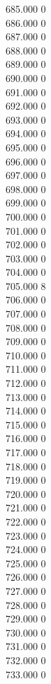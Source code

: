 { 685.000	0 \\
 686.000	0 \\
 687.000	0 \\
 688.000	0 \\
 689.000	0 \\
 690.000	0 \\
 691.000	0 \\
 692.000	0 \\
 693.000	0 \\
 694.000	0 \\
 695.000	0 \\
 696.000	0 \\
 697.000	0 \\
 698.000	0 \\
 699.000	0 \\
 700.000	0 \\
 701.000	0 \\
 702.000	0 \\
 703.000	0 \\
 704.000	0 \\
 705.000	8 \\
 706.000	0 \\
 707.000	0 \\
 708.000	0 \\
 709.000	0 \\
 710.000	0 \\
 711.000	0 \\
 712.000	0 \\
 713.000	0 \\
 714.000	0 \\
 715.000	0 \\
 716.000	0 \\
 717.000	0 \\
 718.000	0 \\
 719.000	0 \\
 720.000	0 \\
 721.000	0 \\
 722.000	0 \\
 723.000	0 \\
 724.000	0 \\
 725.000	0 \\
 726.000	0 \\
 727.000	0 \\
 728.000	0 \\
 729.000	0 \\
 730.000	0 \\
 731.000	0 \\
 732.000	0 \\
 733.000	0 \\
}
